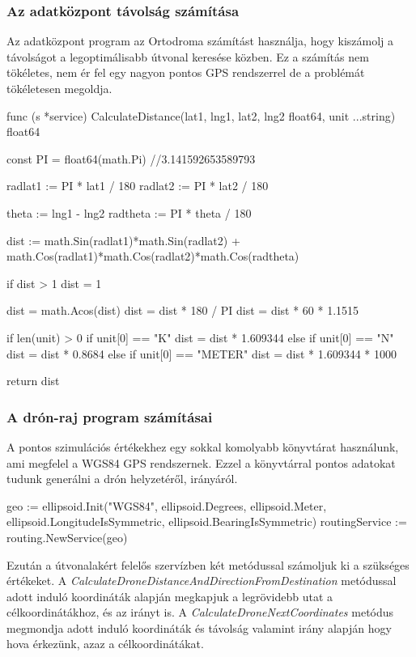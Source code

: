 \subsubsection{Az adatközpont távolság számítása}
Az adatközpont program az Ortodroma számítást használja, hogy kiszámolj a távolságot a legoptimálisabb útvonal keresése közben.
Ez a számítás nem tökéletes, nem ér fel egy nagyon pontos GPS rendszerrel de a problémát tökéletesen megoldja.
\begin{python}
    func (s *service) CalculateDistance(lat1, lng1, lat2,
            lng2 float64, unit ...string) float64 {
        const PI = float64(math.Pi) //3.141592653589793

        radlat1 := PI * lat1 / 180
        radlat2 := PI * lat2 / 180

        theta := lng1 - lng2
        radtheta := PI * theta / 180

        dist := math.Sin(radlat1)*math.Sin(radlat2) +
        math.Cos(radlat1)*math.Cos(radlat2)*math.Cos(radtheta)

        if dist > 1 {
            dist = 1
        }

        dist = math.Acos(dist)
        dist = dist * 180 / PI
        dist = dist * 60 * 1.1515

        if len(unit) > 0 {
            if unit[0] == "K" {
                dist = dist * 1.609344
            } else if unit[0] == "N" {
                dist = dist * 0.8684
            } else if unit[0] == "METER" {
                dist = dist * 1.609344 * 1000
            }
        }

        return dist
    }
\end{python}
\subsubsection{A drón-raj program számításai}
A pontos szimulációs értékekhez egy sokkal komolyabb könyvtárat használunk, ami megfelel a WGS84 GPS rendszernek.
Ezzel a könyvtárral pontos adatokat tudunk generálni a drón helyzetéről, irányáról.


\begin{python}

    geo := ellipsoid.Init("WGS84", ellipsoid.Degrees, ellipsoid.Meter,
    ellipsoid.LongitudeIsSymmetric, ellipsoid.BearingIsSymmetric)
    routingService := routing.NewService(geo)

\end{python}
Ezután a útvonalakért felelős szervízben két metódussal számoljuk ki a szükséges értékeket.
A \textit{CalculateDroneDistanceAndDirectionFromDestination} metódussal adott induló koordináták alapján megkapjuk a legrövidebb utat a célkoordinátákhoz, és az irányt is.
A \textit{CalculateDroneNextCoordinates} metódus megmondja adott induló koordináták és távolság valamint irány alapján hogy hova érkezünk, azaz a célkoordinátákat.


